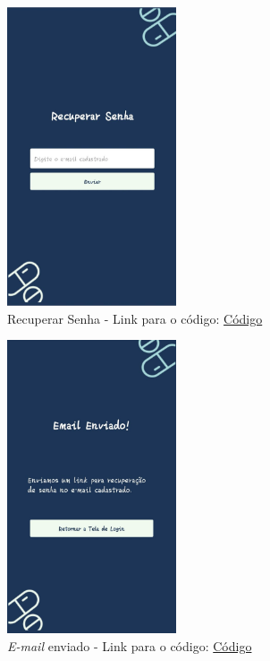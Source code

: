 \begin{apendicesenv}
\begin{figure}[H]
    \centering
    \includegraphics[width=5cm]{figuras/software/telas_frontend/front_RecuperarSenha.jpg}
    \caption{Recuperar Senha - Link para o código: \href{https://github.com/PillWatcher/pillwatcher-dpf-service/blob/dev/components/recuperarSenha.js}{Código}}
    \label{fig:recuperar_senha}
\end{figure}

\begin{figure}[H]
    \centering
    \includegraphics[width=5cm]{figuras/software/telas_frontend/front_EnviarEmail.jpg}
    \caption{\textit{E-mail} enviado - Link para o código: \href{https://github.com/PillWatcher/pillwatcher-dpf-service/blob/dev/components/enviarEmail.js}{Código}}
    \label{fig:email_enviado}
\end{figure}


\end{apendicesenv}
